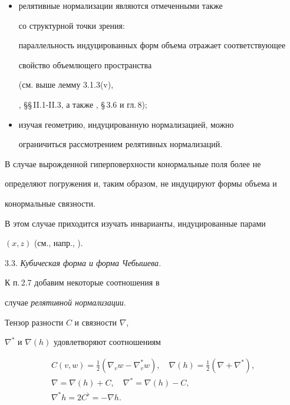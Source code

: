 \begin{itemize}
\item[(iii)] релятивные нормализации являются отмеченными также


со структурной точки зрения:


параллельность индуцированных форм объема отражает соответствующее


свойство объемлющего пространства


(см. выше лемму 3.1.3(v), 


\cite{NOM-SA}, \S\S\,II.1-II.3, а также  \cite{SIM-S-V}, \S\,3.6 и гл.\,8);


\item[(iv)] изучая геометрию, индуцированную нормализацией, можно


ограничиться рассмотрением релятивных нормализаций.


\end{itemize}





В случае вырожденной гиперповерхности конормальные поля более не


определяют погружения и, таким образом, не индуцируют формы объема и


конормальные связности.


В этом случае приходится изучать инварианты, индуцированные парами


$(x,z)$ (см., напр., \cite{OPO}).


\medskip





3.3. {\it  Кубическая форма и форма Чебышева.}


К п.\,2.7 добавим некоторые соотношения в


случае {\it релятивной нормализации}.





Тензор разности $C$ и связности $\nabla$,


$\nabla^*$ и $\nabla (h)$ удовлетворяют соотношениям


\begin{gather*}


C(v,w)= \frac {1}{2}(\nabla_v w - \nabla^*_v w), \quad 


\nabla (h) = \frac {1}{2}(\nabla + \nabla^*), \\


\nabla = \nabla (h) + C, \quad \nabla^* = \nabla (h) - C,\\


\nabla^* h = 2 C^{\flat} = - \nabla h.


\end{gather*}


